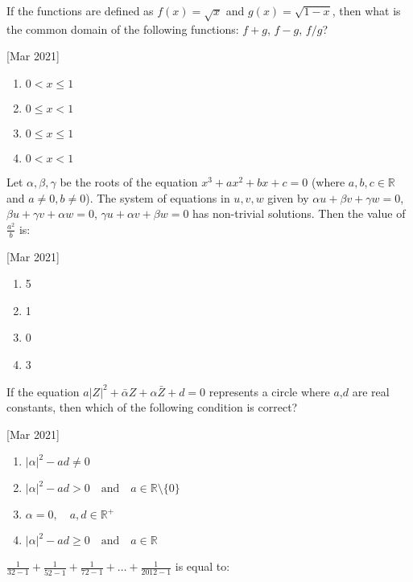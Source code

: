 

\iffalse
\title{March:2021}
\author{AI24BTECH11007}
\section{mcq-single}
\fi
	\item
		If the functions are defined as $f(x)=\sqrt{x}$ and $g(x)=\sqrt{1-x}$, then what is the common domain of the following functions: $f+g$, $f-g$, $f/g$?

		\hfill{[Mar 2021]}
		\begin{multicols}{4}
		\begin{enumerate}
    \item $0 < x \leq 1$
    \item $0 \leq x < 1$
    \item $0 \leq x \leq 1$
    \item $0 < x < 1$
                \end{enumerate}
		\end{multicols}
	\item
		Let $\alpha, \beta, \gamma$ be the roots of the equation $x^3 + ax^2 + bx + c = 0$ (where $a, b, c \in \mathbb{R}$ and $a \neq 0, b \neq 0$). The system of equations in $u, v, w$ given by $\alpha u + \beta v + \gamma w = 0$, $\beta u + \gamma v + \alpha w = 0$, $\gamma u + \alpha v + \beta w = 0$ has non-trivial solutions. Then the value of $\frac{a^2}{b}$ is:

			\hfill{[Mar 2021]}
		\begin{multicols}{4}
               \begin{enumerate}
    \item 5
    \item 1
    \item 0
    \item 3
               \end{enumerate}
		\end{multicols}
       \item
	       If the equation $a{|Z|}^2 + \bar{\alpha}Z + \alpha \bar{Z} + d = 0$ represents a circle where $a$,$d$ are real constants, then which of the following condition is correct?

			\hfill{[Mar 2021]}
			\begin{multicols}{2}
		\begin{enumerate}
    \item $|\alpha|^2 - ad \neq 0$
    \item $|\alpha|^2 - ad > 0 \quad \text{and} \quad a \in \mathbb{R} \setminus \{0\}$
    \item $\alpha = 0, \quad a, d \in \mathbb{R}^+$
    \item $|\alpha|^2 - ad \geq 0 \quad \text{and} \quad a \in \mathbb{R}$
                \end{enumerate}
			\end{multicols}
	\item
		$ \frac{1}{32 - 1} + \frac{1}{52 - 1} + \frac{1}{72 - 1} + \ldots + \frac{1}{2012 - 1} $ is equal to:

